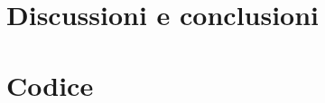 \documentclass[11pt,a4paper]{article} %
\begin{document}
{%
% 	

 	

	



	
\section{Discussioni e conclusioni}
	
	
\newpage
\section{Codice}
} 	%

	
	
\end{document}
